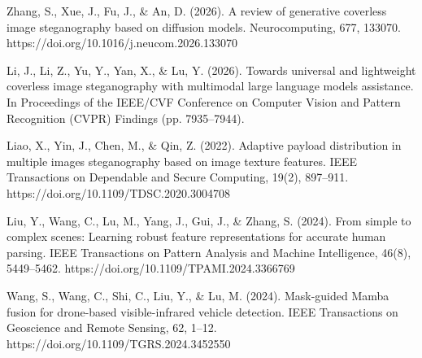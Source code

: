 \documentclass[preprint,12pt]{elsarticle}
\theoremstyle{plain}
\providecommand{\DIFdeltex}[1]{{\protect\color{red} \scriptsize #1}} %
\providecommand{\DIFdelbegin}{} %
\providecommand{\DIFdel}[1]{\texorpdfstring{\DIFdeltex{#1}}{}} %
\providecommand{\DIFscaledelfig}{0.5}
\newlength{\DIFdelgraphicswidth} %
\newlength{\DIFdelgraphicsheight} %
\providecommand{\DIFdelincludegraphics}[2][]{%
\sbox{\DIFdelgraphicsbox}{\DIFOincludegraphics[#1]{#2}}%
\settoboxwidth{\DIFdelgraphicswidth}{\DIFdelgraphicsbox} %
\settoboxtotalheight{\DIFdelgraphicsheight}{\DIFdelgraphicsbox} %
\scalebox{\DIFscaledelfig}{%
\parbox[b]{\DIFdelgraphicswidth}{\usebox{\DIFdelgraphicsbox}\\[-\baselineskip] \rule{\DIFdelgraphicswidth}{0em}}\llap{\resizebox{\DIFdelgraphicswidth}{\DIFdelgraphicsheight}{%
\setlength{\unitlength}{\DIFdelgraphicswidth}%
\begin{picture}(1,1)%
\thicklines\linethickness{2pt} %
{\color[rgb]{1,0,0}\put(0,0){\framebox(1,1){}}}%
{\color[rgb]{1,0,0}\put(0,0){\line( 1,1){1}}}%
{\color[rgb]{1,0,0}\put(0,1){\line(1,-1){1}}}%
\end{picture}%
}\hspace*{3pt}}} %
} %
\DeclareRobustCommand{\DIFdelbegin}{\DIFOdelbegin \let\includegraphics\DIFdelincludegraphics} %
\renewcommand{\DIFdel}[1]{}
\renewcommand{\DIFdelincludegraphics}[2][]{}
\begin{document}
\begin{thebibliography}{28}
Zhang, S., Xue, J., Fu, J., \& An, D. (2026). A review of generative coverless image steganography based on diffusion models. Neurocomputing, 677, 133070. https://doi.org/10.1016/j.neucom.2026.133070

Li, J., Li, Z., Yu, Y., Yan, X., \& Lu, Y. (2026). Towards universal and lightweight coverless image steganography with multimodal large language models assistance. In Proceedings of the IEEE/CVF Conference on Computer Vision and Pattern Recognition (CVPR) Findings (pp. 7935--7944).

Liao, X., Yin, J., Chen, M., \& Qin, Z. (2022). Adaptive payload distribution in multiple images steganography based on image texture features. IEEE Transactions on Dependable and Secure Computing, 19(2), 897--911. https://doi.org/10.1109/TDSC.2020.3004708

Liu, Y., Wang, C., Lu, M., Yang, J., Gui, J., \& Zhang, S. (2024). From simple to complex scenes: Learning robust feature representations for accurate human parsing. IEEE Transactions on Pattern Analysis and Machine Intelligence, 46(8), 5449--5462. https://doi.org/10.1109/TPAMI.2024.3366769

Wang, S., Wang, C., Shi, C., Liu, Y., \& Lu, M. (2024). Mask-guided Mamba fusion for drone-based visible-infrared vehicle detection. IEEE Transactions on Geoscience and Remote Sensing, 62, 1--12. https://doi.org/10.1109/TGRS.2024.3452550

\DIFdelbegin %

\DIFdel{Fu, L., Liao, X., Guo, J., Dong, L., \& Qin, Z. (2025). WaveRecovery: Screen-shooting watermarking based on wavelet and recovery. IEEE Transactions on Circuits and Systems for Video Technology, 35(4), 3603--3618. https://doi.org/10.1109/TCSVT.2024.3510355
}%

\DIFdel{Li, Y., Liao, X., \& Wu, X. (2024). Screen-shooting resistant watermarking with grayscale deviation simulation. IEEE Transactions on Multimedia, 26, 10908--10923. https://doi.org/10.1109/TMM.2024.3415415
}%

\DIFdel{Liao, X., Wang, Y., Wang, T., Hu, J., \& Wu, X. (2023). FAMM: Facial muscle motions for detecting compressed deepfake videos over social networks. IEEE Transactions on Circuits and Systems for Video Technology, 33(12), 7236--7251. https://doi.org/10.1109/TCSVT.2023.3278310
}%


\end{thebibliography}
\end{document}
